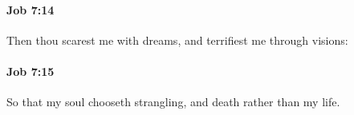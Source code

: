 		\paragraph{Job 7:14} %
			\label{JOB-7-14}

			Then thou scarest me with dreams, and terrifiest me through visions:


		\paragraph{Job 7:15} %
			\label{JOB-7-15}

			So that my soul chooseth strangling, and death rather than my life.


